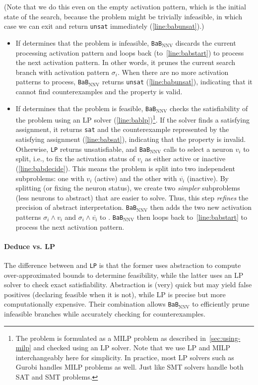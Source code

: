 \documentclass[oneside,11pt,dvipsnames]{book}
\numberwithin{equation}{section}
\theoremstyle{definition}
\theoremstyle{remark}
\newcommand{\mycode}[1]{\textrm{\texttt{#1}}}
\newcommand{\bab}{\texttt{BaB$_{\text{NNV}}$}}
\newcommand{\sat}{\texttt{sat}}
\newcommand{\unsat}{\texttt{unsat}}
\begin{document}
(Note that we do this even on the empty activation pattern, which is the initial state of the search, because the problem might be trivially infeasible, in which case we can exit and return \unsat{} immediately (\autoref{line:babunsat}).)
\begin{itemize}

\item If \Deduce determines that the problem is infeasible, \bab{} discards the current processing activation pattern and loops back (to~\autoref{line:babstart}) to process the next activation pattern. In other words, it prunes the current search branch with activation pattern $\sigma_i$.
When there are no more activation patterns to process, \bab{} returns \unsat{} (\autoref{line:babunsat}), indicating that it cannot find counterexamples and the property is valid.


\item If \Deduce determines that the problem is feasible, \bab{} checks the satisfiability of the problem using an LP solver (\autoref{line:bablp})\footnote{The problem is formulated as a MILP problem as described in~\autoref{sec:using-milp} and checked using an LP solver. Note that we use LP and MILP interchangeably here for simplicity. In practice, most LP solvers such as Gurobi handles MILP problems as well. Just like SMT solvers handle both SAT and SMT problems.}. If the solver finds a satisfying assignment, it returns \sat{} and the counterexample represented by the satisfying assignment (\autoref{line:babsat}), indicating that the property is invalid.
Otherwise, \mycode{LP} returns unsatisfiable, and \bab{} calls \Decide to select a neuron $v_i$ to split, i.e., to fix the activation status of $v_i$ as either active or inactive (\autoref{line:babdecide}).  This means the problem is split into two independent subproblems: one with $v_i$ (active) and the other with $\overline{v_i}$ (inactive).
By splitting (or fixing the neuron status), we create two \emph{simpler} subproblems (less neurons to abstract) that are easier to solve. Thus, this step \emph{refines} the precision of abstract interpretation.
\bab{} then adds the two new activation patterns $\sigma_i \land v_i$ and $\sigma_i \land \overline{v_i}$ to \problems. \bab{} then loops back to~\autoref{line:babstart} to process the next activation pattern.
\end{itemize}


\paragraph{\textbf{Deduce vs. LP}} The difference between \Deduce and \mycode{LP} is that the former uses abstraction to compute over-approximated bounds to determine feasibility, while the latter uses an LP solver to check exact satisfiability.
Abstraction is (very) quick but may yield false positives (declaring feasible when it is not), while LP is precise but more computationally expensive.  Their combination allows \bab{} to efficiently prune infeasible branches while accurately checking for counterexamples.
\end{document}
